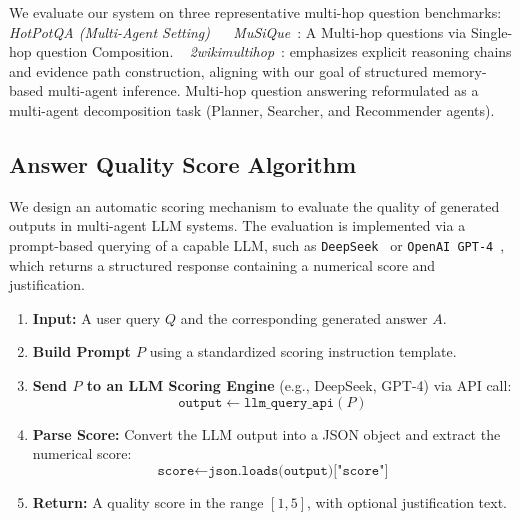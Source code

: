 \documentclass[letterpaper]{article} %
\begin{document}
We evaluate our system on three representative multi-hop question benchmarks: 
~ \textit{HotPotQA (Multi-Agent Setting)}~\cite{yang2018hotpotqa}
~ \textit{MuSiQue}~\cite{trivedi2022musique}: A Multi-hop questions via Single-hop question Composition.
~ \textit{2wikimultihop}~\cite{xanh2020_2wikimultihop}: emphasizes explicit reasoning chains and evidence path construction, aligning with our goal of structured memory-based multi-agent inference.  Multi-hop question answering reformulated as a multi-agent decomposition task (Planner, Searcher, and Recommender agents).

\subsection*{Answer Quality Score Algorithm}

We design an automatic scoring mechanism to evaluate the quality of generated outputs in multi-agent LLM systems. The evaluation is implemented via a prompt-based querying of a capable LLM, such as \texttt{DeepSeek}~\cite{liu2024deepseek,lu2024deepseek} or \texttt{OpenAI GPT-4}~\cite{achiam2023gpt}, which returns a structured response containing a numerical score and justification.

\begin{enumerate}
    \item \textbf{Input:} A user query $Q$ and the corresponding generated answer $A$.
    \item \textbf{Build Prompt $P$} using a standardized scoring instruction template.
    \item \textbf{Send $P$ to an LLM Scoring Engine} (e.g., DeepSeek, GPT-4) via API call:
    \[
        \texttt{output} \leftarrow \texttt{llm\_query\_api}(P)
    \]
    \item \textbf{Parse Score:} Convert the LLM output into a JSON object and extract the numerical score:
    \[
        \texttt{score} \leftarrow \texttt{json.loads(output)["score"]}
    \]
    \item \textbf{Return:} A quality score in the range $[1, 5]$, with optional justification text.
\end{enumerate}
\end{document}
